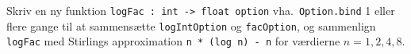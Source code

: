 Skriv en ny funktion \lstinline{logFac : int -> float option} vha.\ \lstinline{Option.bind} 1 eller flere gange til at sammensætte \lstinline{logIntOption} og \lstinline{facOption}, og sammenlign \lstinline{logFac} med Stirlings approximation \lstinline{n * (log n) - n} for værdierne $n= 1, 2, 4, 8$.